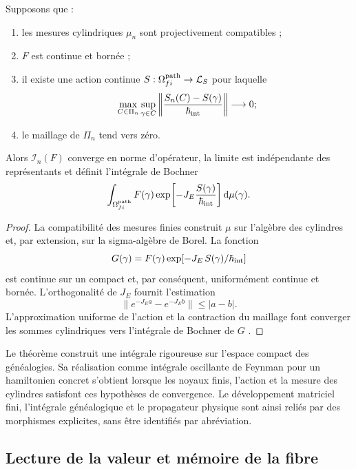\begin{theorem}
\label{x_reciprocidad:thm:integral-genealogica-caminos-rev2}
Supposons que :
\begin{enumerate}
 \item les mesures cylindriques \(\mu_n\) sont projectivement compatibles ;
 \item \(F\) est continue et bornée ;
 \item il existe une action continue \(S:\Omega^{\rm path}_{fi}\to\mathcal L_S\) pour laquelle
 \[
  \max_{C\in\Pi_n}\sup_{\gamma\in C}
  \left\|\frac{S_n(C)-S(\gamma)}{\hbar_{\rm int}}\right\|
  \longrightarrow0;
 \]
 \item le maillage de \(\Pi_n\) tend vers zéro.
\end{enumerate}
Alors \(\mathcal I_n(F)\) converge en norme d’opérateur, la limite est
indépendante des représentants et définit l’intégrale de Bochner
\begin{equation}
 \int_{\Omega^{\rm path}_{fi}}
 F(\gamma)
 \exp\!\left[-J_E\frac{S(\gamma)}{\hbar_{\rm int}}\right]
 \mathrm d\mu(\gamma).
 \label{x_reciprocidad:eq:integral-genealogica-caminos-rev2}
\end{equation}
\end{theorem}

\begin{proof}
La compatibilité des mesures finies construit \(\mu\) sur l'algèbre des cylindres et, par extension, sur la sigma-algèbre de Borel. La fonction
\[
 G(\gamma)=F(\gamma)
 \exp[-J_E\,S(\gamma)/\hbar_{\rm int}]
\]
est continue sur un compact et, par conséquent, uniformément continue et
bornée. L’orthogonalité de \(J_E\) fournit l’estimation
\[
 \|e^{-J_E a}-e^{-J_E b}\|\leq |a-b|.
\]
L’approximation uniforme de l’action et la contraction du maillage font
converger les sommes cylindriques vers l’intégrale de Bochner de \(G\)
\cite{x_reciprocidad:Bochner1955}.
\end{proof}

Le théorème construit une intégrale rigoureuse sur l’espace compact des
généalogies. Sa réalisation comme intégrale oscillante de Feynman pour un
hamiltonien concret s’obtient lorsque les noyaux finis, l’action et la
mesure des cylindres satisfont ces hypothèses de convergence. Le développement
matriciel fini, l’intégrale généalogique et le propagateur physique sont ainsi
reliés par des morphismes explicites, sans être identifiés par abréviation.

\subsection{Lecture de la valeur et mémoire de la fibre}

